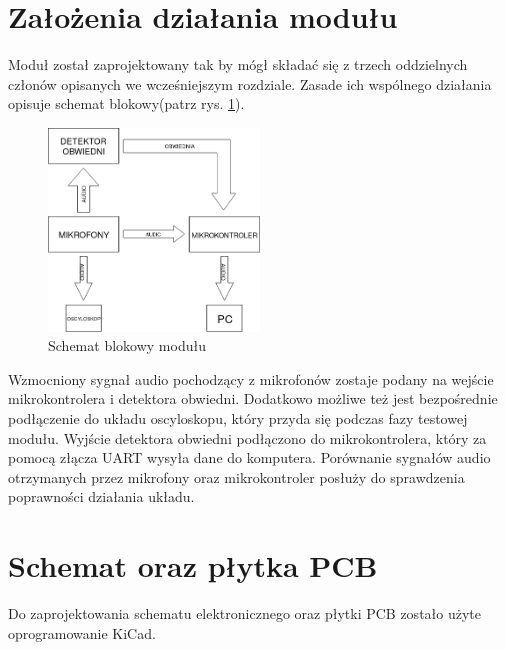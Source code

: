 \documentclass[eng,printmode]{mgr}
\begin{document}
 \section{Założenia działania modułu}
  Moduł został zaprojektowany tak by mógł składać się z trzech oddzielnych członów opisanych we wcześniejszym rozdziale. Zasade ich wspólnego działania opisuje schemat blokowy(patrz rys. \ref{fig-schematblokowy}).
  \begin{figure}[ht]

    \centering

  \includegraphics[width=0.5\textwidth, angle=0]{diagram.png}

    \caption{Schemat blokowy modułu}
 \label{fig-schematblokowy}
    

\end{figure}

Wzmocniony sygnał audio pochodzący z mikrofonów zostaje podany na wejście mikrokontrolera i detektora obwiedni. Dodatkowo możliwe też jest bezpośrednie podłączenie do układu oscyloskopu, który przyda się podczas fazy testowej modułu. Wyjście detektora obwiedni podłączono do mikrokontrolera, który za pomocą złącza UART wysyła dane do komputera.
Porównanie sygnałów audio otrzymanych przez mikrofony oraz mikrokontroler posłuży do sprawdzenia poprawności działania układu. 
\section{Schemat oraz płytka PCB}
Do zaprojektowania schematu elektronicznego oraz płytki PCB zostało użyte oprogramowanie KiCad.
\end{document}
